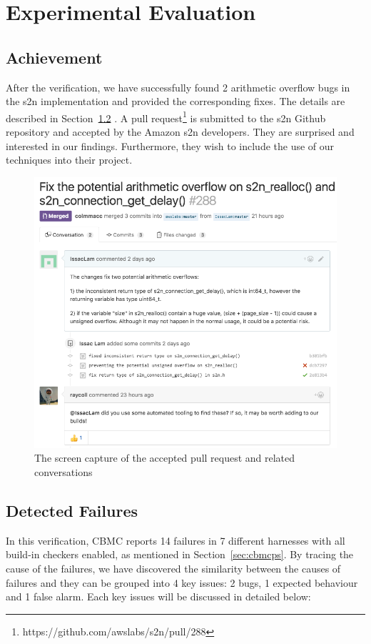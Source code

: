 \chapter{Experimental Evaluation}

\section{Achievement}
After the verification, we have successfully found 2 arithmetic overflow bugs in the s2n implementation and provided the corresponding fixes. The details are described in Section~\ref{seb:df} . A pull request\footnote{https://github.com/awslabs/s2n/pull/288} is submitted to the s2n Github repository and accepted by the Amazon s2n developers. They are surprised and interested in our findings. Furthermore, they wish to include the use of our techniques into their project.

\begin{figure} [tp]
    \centering
    \includegraphics[width=\textwidth]{./contents/images/github-pullrequest.png}
    \caption{The screen capture of the accepted pull request and related conversations }
    \label{fig:achievement}
\end{figure}


\section{Detected Failures} \label{seb:df}
In this verification, CBMC reports 14 failures in 7 different harnesses with all build-in checkers enabled, as mentioned in Section~\ref{sec:cbmcps}. By tracing the cause of the failures, we have discovered the similarity between the causes of failures and they can be grouped into 4 key issues: 2 bugs, 1 expected behaviour and 1 false alarm. Each key issues will be discussed in detailed below:

